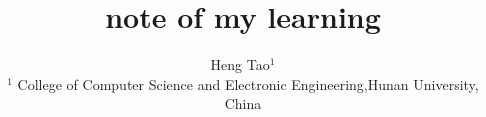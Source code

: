\documentclass[10pt,onecolumn,letterpaper]{IEEEtran}
\begin{document}
\title{note of my learning}
\author{Heng Tao$^1$\\
$^1$ College of Computer Science and Electronic Engineering,Hunan University, China\\}

\maketitle
\vspace{-3em}


%


%

%
\end{document}
